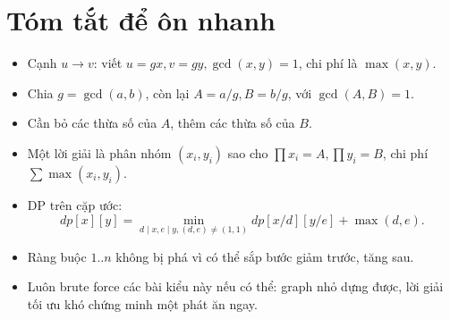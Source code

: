 \documentclass[11pt,a4paper]{article}
\begin{document}
\section{Tóm tắt để ôn nhanh}

\begin{itemize}
  \item Cạnh \(u\rightarrow v\): viết \(u=gx,v=gy,\gcd(x,y)=1\), chi phí là \(\max(x,y)\).
  \item Chia \(g=\gcd(a,b)\), còn lại \(A=a/g,B=b/g\), với \(\gcd(A,B)=1\).
  \item Cần bỏ các thừa số của \(A\), thêm các thừa số của \(B\).
  \item Một lời giải là phân nhóm \((x_i,y_i)\) sao cho \(\prod x_i=A,\prod y_i=B\), chi phí \(\sum\max(x_i,y_i)\).
  \item DP trên cặp ước:
  \[
    dp[x][y]=\min_{d\mid x,e\mid y,(d,e)\ne(1,1)}
    dp[x/d][y/e]+\max(d,e).
  \]
  \item Ràng buộc \(1..n\) không bị phá vì có thể sắp bước giảm trước, tăng sau.
  \item Luôn brute force các bài kiểu này nếu có thể: graph nhỏ dựng được, lời giải tối ưu khó chứng minh một phát ăn ngay.
\end{itemize}
\end{document}
